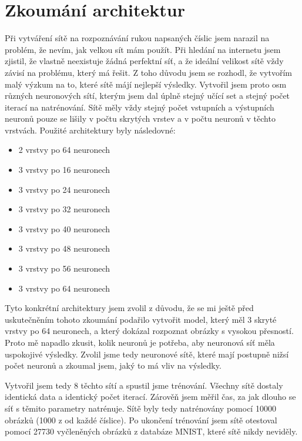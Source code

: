 \section{Zkoumání architektur}
Při vytváření sítě na rozpoznávání rukou napsaných číslic jsem narazil na problém, že nevím, jak velkou sít mám použít.
Při hledání na internetu jsem zjistil, že vlastně neexistuje žádná perfektní síť, a že ideální velikost sítě vždy závisí na problému, který má řešit.
Z toho důvodu jsem se rozhodl, že vytvořím malý výzkum na to, které sítě májí nejlepší výsledky.
Vytvořil jsem proto osm různých neuronových sítí, kterým jsem dal úplně stejný učící set a stejný počet iterací na natrénování.
Sítě měly vždy stejný počet vstupních a výstupních neuronů pouze se lišily v počtu skrytých vrstev a v počtu neuronů v těchto vrstvách.
Použité architektury byly následovné:
\begin{itemize}
    \item 2 vrstvy po 64 neuronech
    \item 3 vrstvy po 16 neuronech
    \item 3 vrstvy po 24 neuronech
    \item 3 vrstvy po 32 neuronech
    \item 3 vrstvy po 40 neuronech
    \item 3 vrstvy po 48 neuronech
    \item 3 vrstvy po 56 neuronech
    \item 3 vrstvy po 64 neuronech
\end{itemize}
Tyto konkrétní architektury jsem zvolil z důvodu, že se mi ještě před uskutečněním tohoto zkoumání podařilo vytvořit model,
který měl 3 skryté vrstvy po 64 neuronech, a který dokázal rozpoznat obrázky s vysokou přesností.
Proto mě napadlo zkusit, kolik neuronů je potřeba, aby neuronová síť měla uspokojivé výsledky.
Zvolil jsme tedy neuronové sítě, které mají postupně nižsí počet neuronů a zkoumal jsem, jaký to má vliv na výsledky.

Vytvořil jsem tedy 8 těchto sítí a spustil jsme trénování. Všechny sítě dostaly identická data a identický počet iterací.
Zárověň jsem měřil čas, za jak dlouho se síť s těmito parametry natrénuje. Sítě byly tedy natrénovány pomocí 10000 obrázků (1000 z od každé číslice).
Po ukončení trénování jsem sítě otestoval pomocí 27730 vyčleněných obrázků z databáze MNIST\cite{mnist}, které sítě nikdy neviděly.


